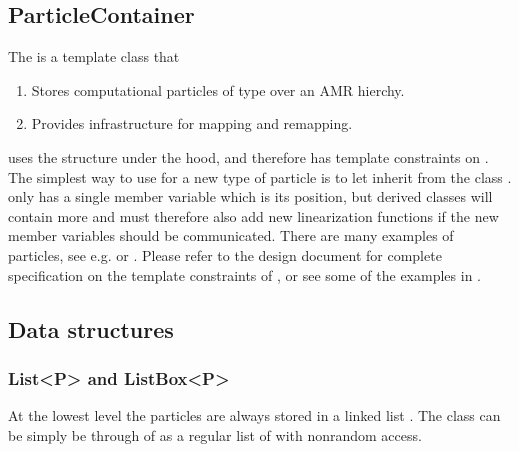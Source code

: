 \documentclass[letterpaper,10pt,english]{sphinxmanual}
\begin{document}
\subsection{ParticleContainer}
\label{\detokenize{Source/Particles:particlecontainer}}
The  is a template class that
\begin{enumerate}
%
\item {} 
Stores computational particles of type  over an AMR hierchy.

\item {} 
Provides infrastructure for mapping and remapping.

\end{enumerate}

 uses the  structure  under the hood, and therefore has template constraints on .
The simplest way to use  for a new type of particle is to let  inherit from the  class .
 only has a single member variable which is its position, but derived classes will contain more and must therefore also add new linearization functions if the new member variables should be communicated.
There are many examples of  particles, see e.g.  or .
Please refer to the  design document for complete specification on the template constraints of , or see some of the examples in .


\subsection{Data structures}
\label{\detokenize{Source/Particles:data-structures}}

\subsubsection{List\textless{}P\textgreater{} and ListBox\textless{}P\textgreater{}}
\label{\detokenize{Source/Particles:list-p-and-listbox-p}}
At the lowest level the particles are always stored in a linked list .
The class can be simply be through of as a regular list of  with non\sphinxhyphen{}random access.
\end{document}

